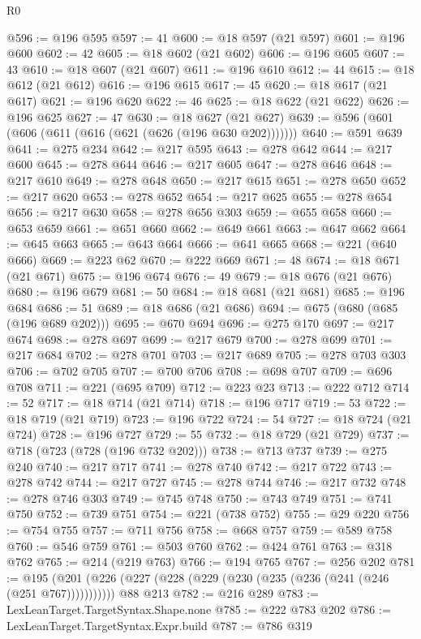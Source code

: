 \begin{lexlean}{R0}
\begin{coremodule}
@596 := @196 @595
@597 := 41
@600 := @18 @597 (@21 @597)
@601 := @196 @600
@602 := 42
@605 := @18 @602 (@21 @602)
@606 := @196 @605
@607 := 43
@610 := @18 @607 (@21 @607)
@611 := @196 @610
@612 := 44
@615 := @18 @612 (@21 @612)
@616 := @196 @615
@617 := 45
@620 := @18 @617 (@21 @617)
@621 := @196 @620
@622 := 46
@625 := @18 @622 (@21 @622)
@626 := @196 @625
@627 := 47
@630 := @18 @627 (@21 @627)
@639 := @596 (@601 (@606 (@611 (@616 (@621 (@626 (@196 @630 @202)))))))
@640 := @591 @639
@641 := @275 @234
@642 := @217 @595
@643 := @278 @642
@644 := @217 @600
@645 := @278 @644
@646 := @217 @605
@647 := @278 @646
@648 := @217 @610
@649 := @278 @648
@650 := @217 @615
@651 := @278 @650
@652 := @217 @620
@653 := @278 @652
@654 := @217 @625
@655 := @278 @654
@656 := @217 @630
@658 := @278 @656 @303
@659 := @655 @658
@660 := @653 @659
@661 := @651 @660
@662 := @649 @661
@663 := @647 @662
@664 := @645 @663
@665 := @643 @664
@666 := @641 @665
@668 := @221 (@640 @666)
@669 := @223 @62
@670 := @222 @669
@671 := 48
@674 := @18 @671 (@21 @671)
@675 := @196 @674
@676 := 49
@679 := @18 @676 (@21 @676)
@680 := @196 @679
@681 := 50
@684 := @18 @681 (@21 @681)
@685 := @196 @684
@686 := 51
@689 := @18 @686 (@21 @686)
@694 := @675 (@680 (@685 (@196 @689 @202)))
@695 := @670 @694
@696 := @275 @170
@697 := @217 @674
@698 := @278 @697
@699 := @217 @679
@700 := @278 @699
@701 := @217 @684
@702 := @278 @701
@703 := @217 @689
@705 := @278 @703 @303
@706 := @702 @705
@707 := @700 @706
@708 := @698 @707
@709 := @696 @708
@711 := @221 (@695 @709)
@712 := @223 @23
@713 := @222 @712
@714 := 52
@717 := @18 @714 (@21 @714)
@718 := @196 @717
@719 := 53
@722 := @18 @719 (@21 @719)
@723 := @196 @722
@724 := 54
@727 := @18 @724 (@21 @724)
@728 := @196 @727
@729 := 55
@732 := @18 @729 (@21 @729)
@737 := @718 (@723 (@728 (@196 @732 @202)))
@738 := @713 @737
@739 := @275 @240
@740 := @217 @717
@741 := @278 @740
@742 := @217 @722
@743 := @278 @742
@744 := @217 @727
@745 := @278 @744
@746 := @217 @732
@748 := @278 @746 @303
@749 := @745 @748
@750 := @743 @749
@751 := @741 @750
@752 := @739 @751
@754 := @221 (@738 @752)
@755 := @29 @220
@756 := @754 @755
@757 := @711 @756
@758 := @668 @757
@759 := @589 @758
@760 := @546 @759
@761 := @503 @760
@762 := @424 @761
@763 := @318 @762
@765 := @214 (@219 @763)
@766 := @194 @765
@767 := @256 @202
@781 := @195
    (@201 (@226 (@227 (@228 (@229 (@230 (@235 (@236 (@241 (@246 (@251 @767)))))))))))
    @88
    @213
@782 := @216 @289
@783 := LexLeanTarget.TargetSyntax.Shape.none
@785 := @222 @783 @202
@786 := LexLeanTarget.TargetSyntax.Expr.build
@787 := @786 @319

\end{coremodule}
\end{lexlean}
